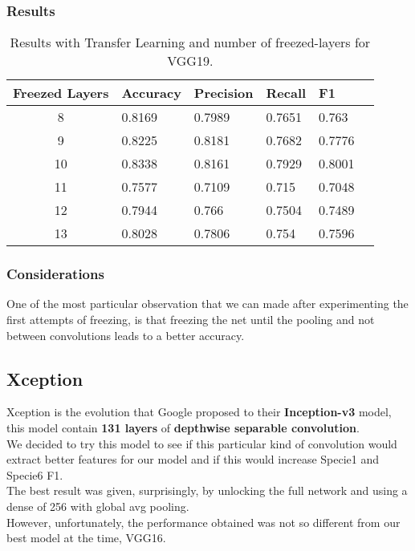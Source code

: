 \documentclass[10pt]{article}
\begin{document}
\subsubsection{Results}
\begin{table}[ht]
\centering
\begin{adjustbox}{width=240}
\small
\begin{tabular}{|c|l|l|l|l|l}

\hline \bf Freezed Layers & \bf Accuracy & \bf Precision & \bf Recall & \bf F1 \\ \hline
8 & 0.8169 & 0.7989 & 0.7651 & 0.763\\
9 & 0.8225 & 0.8181 & 0.7682 & 0.7776\\
10 & 0.8338 & 0.8161 & 0.7929 & 0.8001\\
11 & 0.7577 & 0.7109 & 0.715 & 0.7048\\
12 & 0.7944 & 0.766 & 0.7504 & 0.7489\\
13 & 0.8028 & 0.7806 & 0.754 & 0.7596\\
\hline
\end{tabular}
\end{adjustbox}
\caption{Results with Transfer Learning and number of freezed-layers for VGG19.}
\label{vgg19_results}
\end{table}

\subsubsection{Considerations}
One of the most particular observation that we can made after experimenting the first attempts of freezing, is that freezing the net
until the pooling and not between convolutions leads to a better accuracy.

\subsection{Xception}
Xception is the evolution that Google proposed to their \textbf{Inception-v3} model, this model contain \textbf{131 layers} of \textbf{depthwise separable convolution}.\\
We decided to try this model to see if this particular kind of convolution would extract better features for our model and if this would increase Specie1 and Specie6 F1.\\
The best result was given, surprisingly, by unlocking the full network and using a dense of 256 with global avg pooling.\\
However, unfortunately, the performance obtained was not so different from our best model at the time, VGG16.
\end{document}
